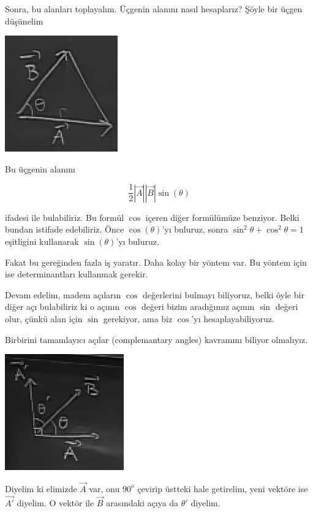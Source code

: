 \documentclass[12pt,fleqn]{article}\usepackage{../../common}
\begin{document}
Sonra, bu alanları toplayalım. Üçgenin alanını nasıl hesaplarız? Şöyle bir
üçgen düşünelim

\begin{center}
\includegraphics[height=5cm]{2_5.png}
\end{center}

Bu üçgenin alanını

$$ \frac{1}{2}|\vec{A}||\vec{B}|\sin(\theta) $$

ifadesi ile bulabiliriz. Bu formül $\cos$ içeren diğer formülümüze benziyor.
Belki bundan istifade edebiliriz. Önce $\cos(\theta)$'yı buluruz, sonra
$\sin^2\theta + \cos^2\theta = 1$ eşitligini kullanarak $\sin(\theta)$'yı
buluruz.

Fakat bu gereğinden fazla iş yaratır. Daha kolay bir yöntem var. Bu yöntem için
ise determinantları kullanmak gerekir.

Devam edelim, madem açıların $\cos$ değerlerini bulmayı biliyoruz, belki öyle
bir diğer açı bulabiliriz ki o açının $\cos$ değeri bizim aradığımız açının
$\sin$ değeri olur, çünkü alan için $\sin$ gerekiyor, ama biz $\cos$'yı
hesaplayabiliyoruz.

Birbirini tamamlayıcı açılar (complemantary angles) kavramını biliyor olmalıyız.

\begin{center}
\includegraphics[height=5cm]{2_6.png}
\end{center}

Diyelim ki elimizde $\vec{A}$ var, onu $90^o$ çevirip üstteki hale getirelim,
yeni vektöre ise $\vec{A'}$ diyelim. O vektör ile $\vec{B}$ arasındaki açıya da
$\theta'$ diyelim.
\end{document}
